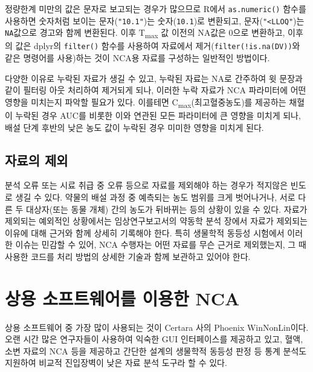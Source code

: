 \documentclass[
  11pt,
  krantz2, a4paper, twoside]{krantz}
\theoremstyle{definition}
\theoremstyle{definition}
\theoremstyle{definition}
\theoremstyle{definition}
\theoremstyle{remark}
\begin{document}
정량한계 미만의 값은 문자로 보고되는 경우가 많으므로 R에서 \texttt{as.numeric()} 함수를 사용하면 숫자처럼 보이는 문자(\texttt{"10.1"})는 숫자(\texttt{10.1})로 변환되고, 문자(\texttt{"\textless{}LLOQ"})는 \texttt{NA}값으로 경고와 함께 변환된다. 이후 T\textsubscript{max} 값 이전의 NA값은 0으로 변환하고, 이후의 값은 dplyr의 \texttt{filter()} 함수를 사용하여 자료에서 제거(\texttt{filter(!is.na(DV))}와 같은 명령어를 사용)하는 것이 NCA용 자료를 구성하는 일반적인 방법이다.

다양한 이유로 누락된 자료가 생길 수 있고, 누락된 자료는 NA로 간주하여 윗 문장과 같이 필터링 아웃 처리하여 제거되게 되나, 이러한 누락 자료가 NCA 파라미터에 어떤 영향을 미치는지 파악할 필요가 있다. 이를테면 C\textsubscript{max}(최고혈중농도)를 제공하는 채혈이 누락된 경우 AUC를 비롯한 이와 연관된 모든 파라미터에 큰 영향을 미치게 되나, 배설 단계 후반의 낮은 농도 값이 누락된 경우 미미한 영향을 미치게 된다.

\hypertarget{uxc790uxb8ccuxc758-uxc81cuxc678}{%
\subsection{자료의 제외}\label{uxc790uxb8ccuxc758-uxc81cuxc678}}

분석 오류 또는 시료 취급 중 오류 등으로 자료를 제외해야 하는 경우가 적지않은 빈도로 생길 수 있다. 약물의 배설 과정 중 예측되는 농도 범위를 크게 벗어나거나, 서로 다른 두 대상자(또는 동물 개체) 간의 농도가 뒤바뀌는 등의 상황이 있을 수 있다. 자료가 제외되는 예외적인 상황에서는 임상연구보고서의 약동학 분석 장에서 자료가 제외되는 이유에 대해 근거와 함께 상세히 기록해야 한다. 특히 생물학적 동등성 시험에서 이러한 이슈는 민감할 수 있어, NCA 수행자는 어떤 자료를 무슨 근거로 제외했는지, 그 때 사용한 코드를 처리 방법의 상세한 기술과 함께 보관하고 있어야 한다. 

\hypertarget{uxc0c1uxc6a9-uxc18cuxd504uxd2b8uxc6e8uxc5b4uxb97c-uxc774uxc6a9uxd55c-nca}{%
\section{상용 소프트웨어를 이용한 NCA}\label{uxc0c1uxc6a9-uxc18cuxd504uxd2b8uxc6e8uxc5b4uxb97c-uxc774uxc6a9uxd55c-nca}}

상용 소프트웨어 중 가장 많이 사용되는 것이 Certara 사의 Phoenix WinNonLin이다. 오랜 시간 많은 연구자들이 사용하여 익숙한 GUI 인터페이스를 제공하고 있고, 혈액, 소변 자료의 NCA 등을 제공하고 간단한 설계의 생물학적 동등성 판정 등 통계 분석도 지원하여 비교적 진입장벽이 낮은 자료 분석 도구라 할 수 있다. 
\end{document}
